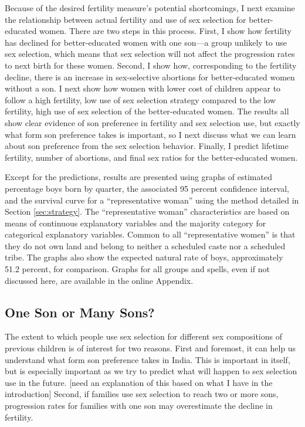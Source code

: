 \documentclass[12pt,letterpaper]{article}
\begin{document}
Because of the desired fertility measure's potential shortcomings, I next examine the 
relationship between actual fertility and use of sex selection for better-educated women.
There are two steps in this process.
First, I show how fertility has declined for better-educated women with one son---a group 
unlikely to use sex selection, which means that sex selection will not affect the 
progression rates to next birth for these women.
Second, I show how, corresponding to the fertility decline, there is an increase in
sex-selective abortions for better-educated women without a son.
I next show how women with lower cost of children appear to follow a high fertility, low
use of sex selection strategy compared to the low fertility, high use of sex selection of
the better-educated women.
The results all show clear evidence of son preference in fertility and sex selection use, 
but exactly what form son preference takes is important, so I next discuss what we can
learn about son preference from the sex selection behavior.
Finally, I predict lifetime fertility, number of abortions, and final sex ratios for
the better-educated women.

Except for the predictions, results are presented using graphs of estimated percentage boys 
born by quarter, the associated 95 percent confidence interval, and the survival curve for 
a ``representative woman'' using the method detailed in Section \ref{sec:strategy}.
The ``representative woman'' characteristics are based on means of continuous 
explanatory variables and the majority category for categorical explanatory variables.
Common to all ``representative women'' is that they do not own land and belong to neither 
a scheduled caste nor a scheduled tribe.
The graphs also show the expected natural rate of boys, approximately 51.2 percent, for
comparison.
Graphs for all groups and spells, even if not discussed here, are available in 
the online Appendix.


\subsection{One Son or Many Sons?}

The extent to which people use sex selection for different sex compositions
of previous children is of interest for two reasons.
First and foremost, it can help us understand what form son preference takes in India.
This is important in itself, but is especially important as we try to predict 
what will happen to sex selection use in the future.
[need an explanation of this based on what I have in the introduction]
Second,
if families use sex selection to reach two or more sons, progression rates for families 
with one son may overestimate the decline in fertility.
\end{document}
